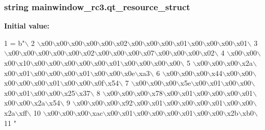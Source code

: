 \subsubsection[{qt\+\_\+resource\+\_\+struct}]{\setlength{\rightskip}{0pt plus 5cm}string mainwindow\+\_\+rc3.\+qt\+\_\+resource\+\_\+struct}\label{namespacemainwindow__rc3_aa53e03411aa4565b05ef799d9ec525b7}
{\bfseries Initial value\+:}
\begin{DoxyCode}
1 = b\textcolor{stringliteral}{"\(\backslash\)}
2 \textcolor{stringliteral}{\(\backslash\)x00\(\backslash\)x00\(\backslash\)x00\(\backslash\)x00\(\backslash\)x00\(\backslash\)x02\(\backslash\)x00\(\backslash\)x00\(\backslash\)x00\(\backslash\)x01\(\backslash\)x00\(\backslash\)x00\(\backslash\)x00\(\backslash\)x01\(\backslash\)}
3 \textcolor{stringliteral}{\(\backslash\)x00\(\backslash\)x00\(\backslash\)x00\(\backslash\)x00\(\backslash\)x00\(\backslash\)x02\(\backslash\)x00\(\backslash\)x00\(\backslash\)x00\(\backslash\)x07\(\backslash\)x00\(\backslash\)x00\(\backslash\)x00\(\backslash\)x02\(\backslash\)}
4 \textcolor{stringliteral}{\(\backslash\)x00\(\backslash\)x00\(\backslash\)x00\(\backslash\)x10\(\backslash\)x00\(\backslash\)x00\(\backslash\)x00\(\backslash\)x00\(\backslash\)x00\(\backslash\)x01\(\backslash\)x00\(\backslash\)x00\(\backslash\)x00\(\backslash\)x00\(\backslash\)}
5 \textcolor{stringliteral}{\(\backslash\)x00\(\backslash\)x00\(\backslash\)x00\(\backslash\)x2a\(\backslash\)x00\(\backslash\)x01\(\backslash\)x00\(\backslash\)x00\(\backslash\)x00\(\backslash\)x01\(\backslash\)x00\(\backslash\)x00\(\backslash\)x0e\(\backslash\)xa3\(\backslash\)}
6 \textcolor{stringliteral}{\(\backslash\)x00\(\backslash\)x00\(\backslash\)x00\(\backslash\)x44\(\backslash\)x00\(\backslash\)x00\(\backslash\)x00\(\backslash\)x00\(\backslash\)x00\(\backslash\)x01\(\backslash\)x00\(\backslash\)x00\(\backslash\)x0f\(\backslash\)x54\(\backslash\)}
7 \textcolor{stringliteral}{\(\backslash\)x00\(\backslash\)x00\(\backslash\)x00\(\backslash\)x5e\(\backslash\)x00\(\backslash\)x01\(\backslash\)x00\(\backslash\)x00\(\backslash\)x00\(\backslash\)x01\(\backslash\)x00\(\backslash\)x00\(\backslash\)x25\(\backslash\)x37\(\backslash\)}
8 \textcolor{stringliteral}{\(\backslash\)x00\(\backslash\)x00\(\backslash\)x00\(\backslash\)x78\(\backslash\)x00\(\backslash\)x01\(\backslash\)x00\(\backslash\)x00\(\backslash\)x00\(\backslash\)x01\(\backslash\)x00\(\backslash\)x00\(\backslash\)x2a\(\backslash\)x54\(\backslash\)}
9 \textcolor{stringliteral}{\(\backslash\)x00\(\backslash\)x00\(\backslash\)x00\(\backslash\)x92\(\backslash\)x00\(\backslash\)x01\(\backslash\)x00\(\backslash\)x00\(\backslash\)x00\(\backslash\)x01\(\backslash\)x00\(\backslash\)x00\(\backslash\)x2a\(\backslash\)xff\(\backslash\)}
10 \textcolor{stringliteral}{\(\backslash\)x00\(\backslash\)x00\(\backslash\)x00\(\backslash\)xac\(\backslash\)x00\(\backslash\)x01\(\backslash\)x00\(\backslash\)x00\(\backslash\)x00\(\backslash\)x01\(\backslash\)x00\(\backslash\)x00\(\backslash\)x2b\(\backslash\)xb0\(\backslash\)}
11 \textcolor{stringliteral}{"}
\end{DoxyCode}
